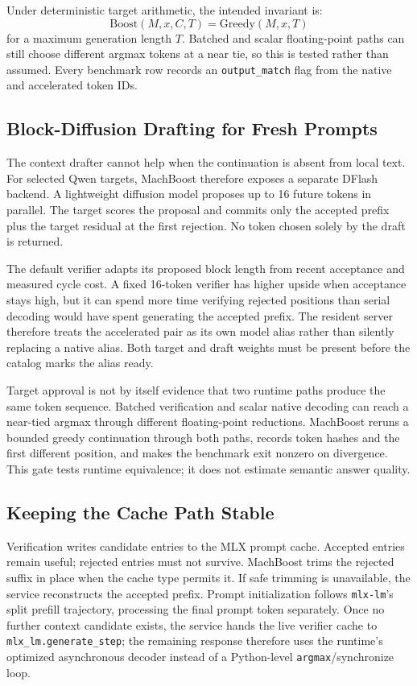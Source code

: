 \documentclass[11pt]{article}
\begin{document}
Under deterministic target arithmetic, the intended invariant is:
\[
  \mathrm{Boost}(M,x,C,T) = \mathrm{Greedy}(M,x,T)
\]
for a maximum generation length $T$. Batched and scalar floating-point paths can still choose different argmax tokens at a near tie, so this is tested rather than assumed. Every benchmark row records an \texttt{output\_match} flag from the native and accelerated token IDs.

\subsection{Block-Diffusion Drafting for Fresh Prompts}
The context drafter cannot help when the continuation is absent from local text.
For selected Qwen targets, MachBoost therefore exposes a separate DFlash backend.
A lightweight diffusion model proposes up to 16 future tokens in parallel. The
target scores the proposal and commits only the accepted prefix plus the target
residual at the first rejection. No token chosen solely by the draft is returned.

The default verifier adapts its proposed block length from recent acceptance and
measured cycle cost. A fixed 16-token verifier has higher upside when acceptance
stays high, but it can spend more time verifying rejected positions than serial
decoding would have spent generating the accepted prefix. The resident server
therefore treats the accelerated pair as its own model alias rather than silently
replacing a native alias. Both target and draft weights must be present before the
catalog marks the alias ready.

Target approval is not by itself evidence that two runtime paths produce the same
token sequence. Batched verification and scalar native decoding can reach a
near-tied argmax through different floating-point reductions. MachBoost reruns a
bounded greedy continuation through both paths, records token hashes and the first
different position, and makes the benchmark exit nonzero on divergence. This gate
tests runtime equivalence; it does not estimate semantic answer quality.

\subsection{Keeping the Cache Path Stable}
Verification writes candidate entries to the MLX prompt cache. Accepted entries remain useful; rejected entries must not survive. MachBoost trims the rejected suffix in place when the cache type permits it. If safe trimming is unavailable, the service reconstructs the accepted prefix. Prompt initialization follows \texttt{mlx-lm}'s split prefill trajectory, processing the final prompt token separately. Once no further context candidate exists, the service hands the live verifier cache to \texttt{mlx\_lm.generate\_step}; the remaining response therefore uses the runtime's optimized asynchronous decoder instead of a Python-level \texttt{argmax}/synchronize loop.
\end{document}
